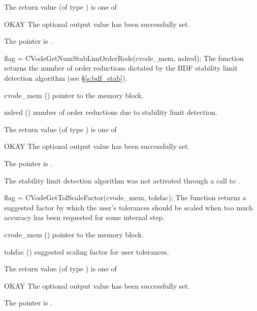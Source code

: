 {
  The return value  (of type ) is one of
  \begin{args}
  \item[OKAY] 
    The optional output value has been successfully set.
  \item[\Id{CVG\_NO\_MEM}]
    The  pointer is .
  \end{args}
}
{}
{
  flag = CVodeGetNumStabLimOrderReds(cvode\_mem, nslred);
}
{
  The function  returns the
  number of order reductions dictated by the BDF stability limit 
  detection algorithm (see \S\ref{s:bdf_stab}).
}
{
  \begin{args}
  \item[cvode\_mem] ()
    pointer to the {\cvode} memory block.
  \item[nslred] ()
    number of order reductions due to stability limit detection.
  \end{args}
}
{
  The return value  (of type ) is one of
  \begin{args}
  \item[OKAY] 
    The optional output value has been successfully set.
  \item[\Id{CVG\_NO\_MEM}]
    The  pointer is .
  \item[\Id{CVG\_NO\_SLDET}]
    The stability limit detection algorithm was not activated 
    through a call to .
  \end{args}
}
{}
{
  flag = CVodeGetTolScaleFactor(cvode\_mem, tolsfac);
}
{
  The function  returns a
  suggested factor by which the user's tolerances 
  should be scaled when too much accuracy has been 
  requested for some internal step.
}
{
  \begin{args}
  \item[cvode\_mem] ()
    pointer to the {\cvode} memory block.
  \item[tolsfac] ()
    suggested scaling factor for user tolerances.
  \end{args}
}
{
  The return value  (of type ) is one of
  \begin{args}
  \item[OKAY] 
    The optional output value has been successfully set.
  \item[\Id{CVG\_NO\_MEM}]
    The  pointer is .
  \end{args}
}
